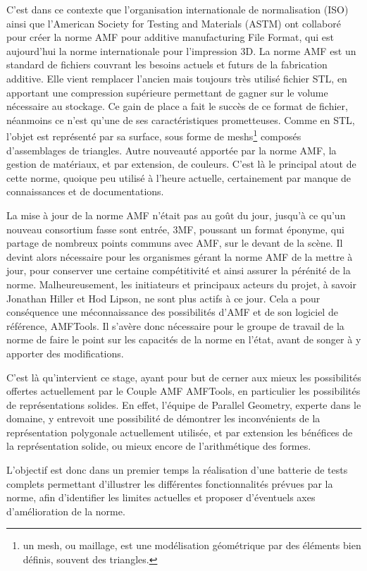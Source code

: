 \documentclass{tnreport}
\begin{document}
C'est dans ce contexte que l'organisation internationale de normalisation (ISO) ainsi que l'American Society for Testing and Materials (ASTM) ont collaboré pour créer la norme AMF pour additive manufacturing File Format, qui est aujourd'hui la norme internationale pour l'impression 3D. La norme AMF est un standard de fichiers couvrant les besoins actuels et futurs de la fabrication additive. Elle vient remplacer l'ancien mais toujours très utilisé fichier STL, en apportant une compression supérieure permettant de gagner sur le volume nécessaire au stockage. Ce gain de place a fait le succès de ce format de fichier, néanmoins ce n'est qu'une de ses caractéristiques prometteuses. Comme en STL, l'objet est représenté par sa surface, sous forme de meshs\footnote{un mesh, ou maillage, est une modélisation géométrique par des éléments bien définis, souvent des triangles.} composés d'assemblages de triangles. Autre nouveauté apportée par la norme AMF, la gestion de matériaux, et par extension, de couleurs. C'est là le principal atout de cette norme, quoique peu utilisé à l'heure actuelle, certainement par manque de connaissances et de documentations.

La mise à jour de la norme AMF n'était pas au goût du jour, jusqu'à ce qu'un nouveau consortium fasse sont entrée, 3MF, poussant un format éponyme, qui partage de nombreux points communs avec AMF, sur le devant de la scène. Il devint alors nécessaire pour les organismes gérant la norme AMF de la mettre à jour, pour conserver une certaine compétitivité et ainsi assurer la pérénité de la norme. Malheureusement, les initiateurs et principaux acteurs du projet, à savoir Jonathan Hiller et Hod Lipson, ne sont plus actifs à ce jour. Cela a pour conséquence une méconnaissance des possibilités d'AMF et de son logiciel de référence, AMFTools. Il s'avère donc nécessaire pour le groupe de travail de la norme de faire le point sur les capacités de la norme en l'état, avant de songer à y apporter des modifications.

C'est là qu'intervient ce stage, ayant pour but de cerner aux mieux les possibilités offertes actuellement par le Couple AMF AMFTools, en particulier les possibilités de représentations solides. En effet, l'équipe de Parallel Geometry, experte dans le domaine, y entrevoit une possibilité de démontrer les inconvénients de la représentation polygonale actuellement utilisée, et par extension les bénéfices de la représentation solide, ou mieux encore de l'arithmétique des formes.    

L'objectif est donc dans un premier temps la réalisation d'une batterie de tests complets permettant d'illustrer les différentes fonctionnalités prévues par la norme, afin d'identifier les limites actuelles et proposer d'éventuels axes d'amélioration de la norme.
\cleardoublepage
\end{document}
